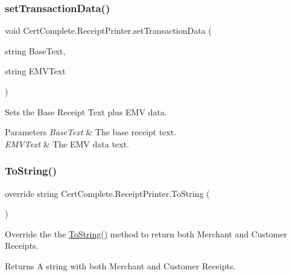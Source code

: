 \subsubsection{\texorpdfstring{set\+Transaction\+Data()}{setTransactionData()}\hspace{0.1cm}{\footnotesize\ttfamily [2/2]}}
{\footnotesize\ttfamily void Cert\+Complete.\+Receipt\+Printer.\+set\+Transaction\+Data (\begin{DoxyParamCaption}\item[{string}]{Base\+Text,  }\item[{string}]{E\+M\+V\+Text }\end{DoxyParamCaption})\hspace{0.3cm}{\ttfamily [inline]}}



Sets the Base Receipt Text plus E\+MV data. 


\begin{DoxyParams}{Parameters}
{\em Base\+Text} & The base receipt text.\\
\hline
{\em E\+M\+V\+Text} & The E\+MV data text.\\
\hline
\end{DoxyParams}
\mbox{\label{class_cert_complete_1_1_receipt_printer_a5feb1b4895e079a595f0b01cac5fc6da}} 
\subsubsection{\texorpdfstring{To\+String()}{ToString()}}
{\footnotesize\ttfamily override string Cert\+Complete.\+Receipt\+Printer.\+To\+String (\begin{DoxyParamCaption}{ }\end{DoxyParamCaption})\hspace{0.3cm}{\ttfamily [inline]}}



Override the the \mbox{\hyperlink{class_cert_complete_1_1_receipt_printer_a5feb1b4895e079a595f0b01cac5fc6da}{To\+String()}} method to return both Merchant and Customer Receipts. 

\begin{DoxyReturn}{Returns}
A string with both Merchant and Customer Receipts.
\end{DoxyReturn}
\mbox{\label{class_cert_complete_1_1_receipt_printer_a37048f7fb5c13d6238e6377651421191}} 
